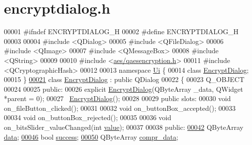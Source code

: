 \hypertarget{encryptdialog_8h_source}{}\section{encryptdialog.\+h}

\begin{DoxyCode}
00001 \textcolor{preprocessor}{#ifndef ENCRYPTDIALOG\_H}
00002 \textcolor{preprocessor}{#define ENCRYPTDIALOG\_H}
00003 
00004 \textcolor{preprocessor}{#include <QDialog>}
00005 \textcolor{preprocessor}{#include <QFileDialog>}
00006 \textcolor{preprocessor}{#include <QImage>}
00007 \textcolor{preprocessor}{#include <QMessageBox>}
00008 \textcolor{preprocessor}{#include <QString>}
00009 
00010 \textcolor{preprocessor}{#include <\hyperlink{qaesencryption_8h}{aes/qaesencryption.h}>}
00011 \textcolor{preprocessor}{#include <QCryptographicHash>}
00012 
00013 \textcolor{keyword}{namespace }\hyperlink{namespace_ui}{Ui} \{
00014 \textcolor{keyword}{class }\hyperlink{class_encrypt_dialog}{EncryptDialog};
00015 \}
\hypertarget{encryptdialog_8h_source.tex_l00021}{}\hyperlink{class_encrypt_dialog}{00021} \textcolor{keyword}{class }\hyperlink{class_encrypt_dialog}{EncryptDialog} : \textcolor{keyword}{public} QDialog
00022 \{
00023     Q\_OBJECT
00024 
00025 \textcolor{keyword}{public}:
00026     \textcolor{keyword}{explicit} \hyperlink{class_encrypt_dialog}{EncryptDialog}(QByteArray \_data, QWidget *parent = 0);
00027     ~\hyperlink{class_encrypt_dialog}{EncryptDialog}();
00028 
00029 \textcolor{keyword}{public} slots:
00030     \textcolor{keywordtype}{void} on\_fileButton\_clicked();
00031 
00032     \textcolor{keywordtype}{void} on\_buttonBox\_accepted();
00033 
00034     \textcolor{keywordtype}{void} on\_buttonBox\_rejected();
00035 
00036     \textcolor{keywordtype}{void} on\_bitsSlider\_valueChanged(\textcolor{keywordtype}{int} \hyperlink{namespace_errors_dict_setup_a4436d6af623cbe45d37493afe4de9461}{value});
00037 
00038 \textcolor{keyword}{public}:
\hypertarget{encryptdialog_8h_source.tex_l00042}{}\hyperlink{class_encrypt_dialog_acf3a8bbce90d99ef17fec093c35b1008}{00042}     QByteArray \hyperlink{class_encrypt_dialog_acf3a8bbce90d99ef17fec093c35b1008}{data};
\hypertarget{encryptdialog_8h_source.tex_l00046}{}\hyperlink{class_encrypt_dialog_ada4900bcd40894d9c098c65aa4066ac9}{00046}     \textcolor{keywordtype}{bool} \hyperlink{class_encrypt_dialog_ada4900bcd40894d9c098c65aa4066ac9}{success};
\hypertarget{encryptdialog_8h_source.tex_l00050}{}\hyperlink{class_encrypt_dialog_a3e8998aa39696cbd1242f6420ef18143}{00050}     QByteArray \hyperlink{class_encrypt_dialog_a3e8998aa39696cbd1242f6420ef18143}{compr\_data};

\end{DoxyCode}
